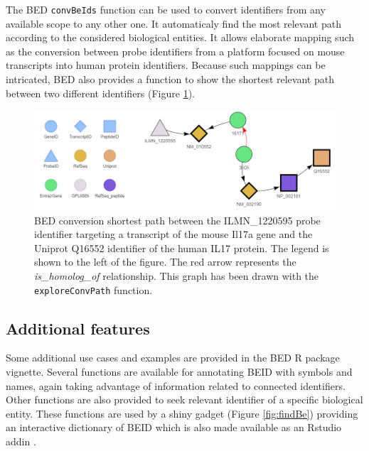 \documentclass[9pt,a4paper,]{extarticle}
\theoremstyle{definition}
\theoremstyle{definition}
\theoremstyle{definition}
\theoremstyle{remark}
\begin{document}
The BED \texttt{convBeIds} function can be used to convert identifiers from
any available scope to any other one. It automaticaly find the most
relevant path according to the considered biological entities.
It allows elaborate mapping such as the conversion between
probe identifiers from a platform focused on mouse transcripts into
human protein identifiers.
Because such mappings can be intricated,
BED also provides a function to show the shortest relevant path between
two different identifiers (Figure \ref{fig:explConv}).

\begin{figure}

{\centering \includegraphics[width=1\linewidth]{img/ILMN_1220595-Conversion} 

}

\caption{BED conversion shortest path between the ILMN\_1220595 probe identifier targeting a transcript of the mouse Il17a gene and the Uniprot Q16552 identifier of the human IL17 protein. The legend is shown to the left of the figure. The red arrow represents the \emph{is\_homolog\_of} relationship. This graph has been drawn with the \texttt{exploreConvPath} function.}\label{fig:explConv}
\end{figure}

\subsection{Additional features}\label{additional-features}

Some additional use cases and examples are provided in
the BED R package vignette.
Several functions are available for annotating BEID with symbols and names,
again taking advantage of information related to connected identifiers.
Other functions are also provided to seek relevant identifier of a specific
biological entity. These functions are used by a shiny \citep{chang_shiny:_2017}
gadget (Figure \ref{fig:findBe})
providing an interactive dictionary of BEID which is also made
available as an Rstudio addin \citep{cheng_miniui:_2016, allaire_rstudioapi:_2017}.
\end{document}
